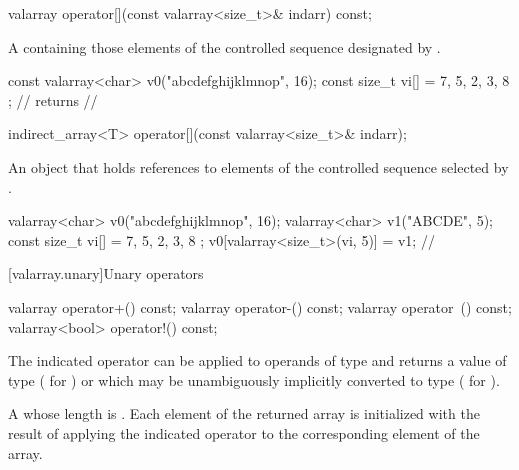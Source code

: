 %
\begin{itemdecl}
valarray operator[](const valarray<size_t>& indarr) const;
\end{itemdecl}

\begin{itemdescr}
\pnum
\returns
A  containing those
elements of the controlled sequence designated by .
\begin{example}
\begin{codeblock}
const valarray<char> v0("abcdefghijklmnop", 16);
const size_t vi[] = { 7, 5, 2, 3, 8 };
//  returns
// 
\end{codeblock}
\end{example}
\end{itemdescr}

%
\begin{itemdecl}
indirect_array<T> operator[](const valarray<size_t>& indarr);
\end{itemdecl}

\begin{itemdescr}
\pnum
\returns
An object that holds references to elements of the controlled
sequence selected by .
\begin{example}
\begin{codeblock}
valarray<char> v0("abcdefghijklmnop", 16);
valarray<char> v1("ABCDE", 5);
const size_t vi[] = { 7, 5, 2, 3, 8 };
v0[valarray<size_t>(vi, 5)] = v1;
// 
\end{codeblock}
\end{example}
\end{itemdescr}

[valarray.unary]{Unary operators}

%
%
%
%
\begin{itemdecl}
valarray operator+() const;
valarray operator-() const;
valarray operator~() const;
valarray<bool> operator!() const;
\end{itemdecl}

\begin{itemdescr}
\pnum
\mandates
The indicated operator can be applied to operands of type 
and returns a value of type  ( for
) or which may be unambiguously implicitly converted to type
 ( for ).

\pnum
\returns
A  whose length is .
Each element of the returned array is initialized with the result of
applying the indicated operator to the corresponding element of the array.
\end{itemdescr}

